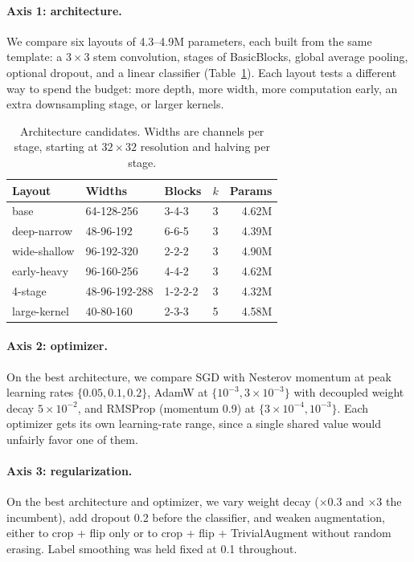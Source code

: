 \documentclass[letterpaper]{article} %
\begin{document}
\paragraph{Axis 1: architecture.}
We compare six layouts of 4.3--4.9M parameters, each built from the same template: a $3\times3$ stem convolution, stages of BasicBlocks, global average pooling, optional dropout, and a linear classifier (Table~\ref{tab:archs}). Each layout tests a different way to spend the budget: more depth, more width, more computation early, an extra downsampling stage, or larger kernels.

\begin{table}[t]
\centering
\small
\setlength{\tabcolsep}{4pt}
\begin{tabular}{lllcr}
\toprule
Layout & Widths & Blocks & $k$ & Params \\
\midrule
base         & 64-128-256    & 3-4-3   & 3 & 4.62M \\
deep-narrow  & 48-96-192     & 6-6-5   & 3 & 4.39M \\
wide-shallow & 96-192-320    & 2-2-2   & 3 & 4.90M \\
early-heavy  & 96-160-256    & 4-4-2   & 3 & 4.62M \\
4-stage      & 48-96-192-288 & 1-2-2-2 & 3 & 4.32M \\
large-kernel & 40-80-160     & 2-3-3   & 5 & 4.58M \\
\bottomrule
\end{tabular}
\caption{Architecture candidates. Widths are channels per stage, starting at $32\times32$ resolution and halving per stage.}
\label{tab:archs}
\end{table}

\paragraph{Axis 2: optimizer.}
On the best architecture, we compare SGD with Nesterov momentum at peak learning rates $\{0.05, 0.1, 0.2\}$, AdamW at $\{10^{-3}, 3\times10^{-3}\}$ with decoupled weight decay $5\times10^{-2}$, and RMSProp (momentum 0.9) at $\{3\times10^{-4}, 10^{-3}\}$. Each optimizer gets its own learning-rate range, since a single shared value would unfairly favor one of them.

\paragraph{Axis 3: regularization.}
On the best architecture and optimizer, we vary weight decay ($\times0.3$ and $\times3$ the incumbent), add dropout 0.2 before the classifier, and weaken augmentation, either to crop + flip only or to crop + flip + TrivialAugment without random erasing. Label smoothing was held fixed at 0.1 throughout.
\end{document}
